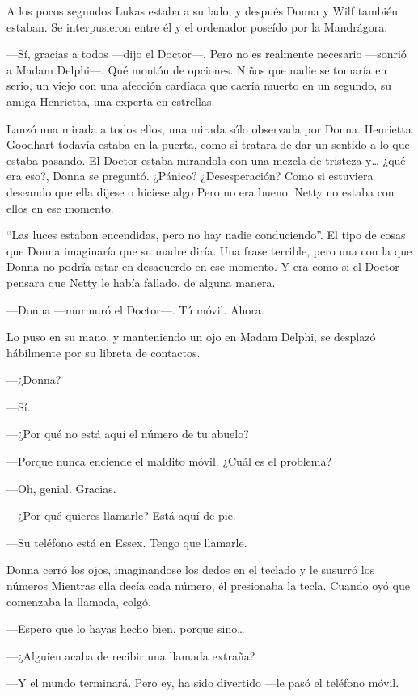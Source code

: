 A los pocos segundos Lukas estaba a su lado, y después Donna y Wilf
también estaban. Se interpusieron entre él y el ordenador poseído por la
Mandrágora.

---Sí, gracias a todos ---dijo el Doctor---. Pero no es realmente
necesario ---sonrió a Madam Delphi---. Qué montón de opciones. Niños que
nadie se tomaría en serio, un viejo con una afección cardíaca que caería
muerto en un segundo, su amiga Henrietta, una experta en estrellas.

Lanzó una mirada a todos ellos, una mirada sólo observada por Donna.
Henrietta Goodhart todavía estaba en la puerta, como si tratara de dar
un sentido a lo que estaba pasando. El Doctor estaba mirandola con una
mezcla de tristeza y\ldots{} ¿qué era eso?, Donna se preguntó. ¿Pánico?
¿Desesperación? Como si estuviera deseando que ella dijese o hiciese
algo Pero no era bueno. Netty no estaba con ellos en ese momento.

``Las luces estaban encendidas, pero no hay nadie conduciendo''. El tipo
de cosas que Donna imaginaría que su madre diría. Una frase terrible,
pero una con la que Donna no podría estar en desacuerdo en ese momento.
Y era como si el Doctor pensara que Netty le había fallado, de alguna
manera.

---Donna ---murmuró el Doctor---. Tú móvil. Ahora.

Lo puso en su mano, y manteniendo un ojo en Madam Delphi, se desplazó
hábilmente por su libreta de contactos.

---¿Donna?

---Sí.

---¿Por qué no está aquí el número de tu abuelo?

---Porque nunca enciende el maldito móvil. ¿Cuál es el problema?

---Oh, genial. Gracias.

---¿Por qué quieres llamarle? Está aquí de pie.

---Su teléfono está en Essex. Tengo que llamarle.

Donna cerró los ojos, imaginandose los dedos en el teclado y le susurró
los números Mientras ella decía cada número, él presionaba la tecla.
Cuando oyó que comenzaba la llamada, colgó.

---Espero que lo hayas hecho bien, porque sino\ldots{}

---¿Alguien acaba de recibir una llamada extraña?

---Y el mundo terminará. Pero ey, ha sido divertido ---le pasó el
teléfono móvil.

